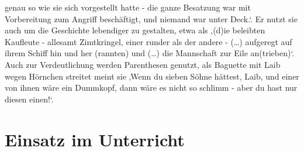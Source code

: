 {genau so wie sie sich vorgestellt hatte - die ganze Besatzung war mit Vorbereitung zum Angriff beschäftigt, und niemand war unter Deck.‘.\cite[S.257]{pir} Er nutzt sie auch um die Geschichte lebendiger zu gestalten, etwa als ‚(d)ie beleibten Kaufleute - allesamt Zimtkringel, einer runder als der andere - (…) aufgeregt auf ihrem Schiff hin und her (rannten) und (…) die Mannschaft zur Eile an(trieben)‘.\cite[S.52]{pir} Auch zur Verdeutlichung werden Parenthesen genutzt, als Baguette mit Laib wegen Hörnchen streitet \cite[S.87]{pir} meint sie ‚Wenn du sieben Söhne hättest, Laib, und einer von ihnen wäre ein Dummkopf, dann wäre es nicht so schlimm - aber du hast nur diesen einen!‘.\cite[S.87]{pir}


\section{Einsatz im Unterricht}

}
